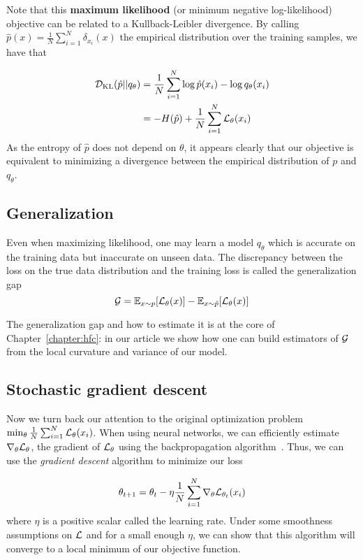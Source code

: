 Note that this \textbf{maximum likelihood} (or minimum negative log-likelihood) objective can be related to a Kullback-Leibler divergence. By calling $\hat{p}(x) = \frac{1}{N} \sum_{i=1}^N \delta_{x_i}(x)$ the empirical distribution over the training samples, we have that

\begin{align*}
{\mathcal{D}}_{\mathrm{KL}}(\hat{p}||q_\theta) &= \frac{1}{N} \sum_{i=1}^N \log \hat{p}(x_i) - \log q_\theta(x_i) \\
&= - H(\hat{p}) +  \frac{1}{N} \sum_{i=1}^N {\mathcal{L}}_\theta(x_i)\\
\end{align*}
As the entropy of $\hat{p}$ does not depend on $\theta$, it appears clearly that our objective is equivalent to minimizing a divergence between the empirical distribution of $p$ and $q_\theta$.

\subsection{Generalization}
Even when maximizing likelihood, one may learn a model $q_\theta$ which is accurate on the training data but inaccurate on unseen data. %
The discrepancy between the loss on the true data distribution and the training loss is called the generalization gap
$${\mathcal{G}} = \mathbb{E}_{x\sim p}[{\mathcal{L}}_\theta(x)] -\mathbb{E}_{x\sim \hat{p}}[{\mathcal{L}}_\theta(x)]$$


The generalization gap and how to estimate it is at the core of Chapter~\ref{chapter:hfc}: in our article we show how one can build estimators of ${\mathcal{G}}$ from the local curvature and variance of our model. 

\subsection{Stochastic gradient descent}
Now we turn back our attention to the original optimization problem $\min_\theta
\frac{1}{N} \sum_{i=1}^N {\mathcal{L}}_\theta(x_i)$. When using neural networks, we can
efficiently estimate $\nabla_\theta {\mathcal{L}}_\theta$, the gradient of ${\mathcal{L}}_\theta$ using the backpropagation algorithm~\citep{rumelhart1986learning}. Thus, we can use the \emph{gradient descent} algorithm to minimize our loss

\begin{equation}
\label{eq:gradient_descent}
    \theta_{t+1} = \theta_t - \eta \frac{1}{N} \sum_{i=1}^N \nabla_\theta {\mathcal{L}}_{\theta_t}(x_i)
\end{equation}
where $\eta$ is a positive scalar called the learning rate. Under some smoothness assumptions on ${\mathcal{L}}$ and for a small enough $\eta$, we can show that this algorithm will converge to a local minimum of our objective function.

